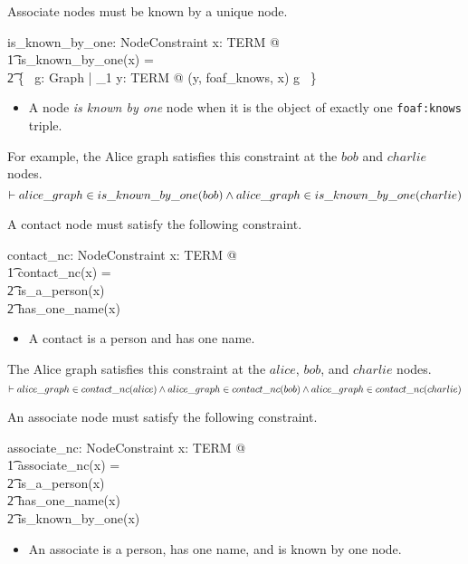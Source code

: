 \documentclass{article}
\begin{document}
Associate nodes must be known by a unique node.
\begin{axdef}
	is\_known\_by\_one: NodeConstraint
\where
	\forall x: TERM @ \\
\t1		is\_known\_by\_one(x) = \\
\t2			\{~ g: Graph | \exists_1 y: TERM @ (y, foaf\_knows, x) \in g ~\}
\end{axdef}
\begin{itemize}
\item A node {\em is known by one} node when it is the object of exactly one {\tt foaf:knows} triple.
\end{itemize}

For example, the Alice graph satisfies this constraint at the $bob$ and $charlie$ nodes.
\[\vdash
	alice\_graph \in is\_known\_by\_one(bob) \land \\
	alice\_graph \in is\_known\_by\_one(charlie)
\]

A contact node must satisfy the following constraint.
\begin{axdef}
	contact\_nc: NodeConstraint
\where
	\forall x: TERM @ \\
\t1		contact\_nc(x) = \\
\t2			is\_a\_person(x) \cap \\
\t2			has\_one\_name(x)
\end{axdef}
\begin{itemize}
\item A contact is a person and has one name.
\end{itemize}

The Alice graph satisfies this constraint at the $alice$, $bob$, and $charlie$ nodes.
\[\vdash
	alice\_graph \in contact\_nc(alice) \land \\
	alice\_graph \in contact\_nc(bob) \land \\
	alice\_graph \in contact\_nc(charlie)
\]

An associate node must satisfy the following constraint.
\begin{axdef}
	associate\_nc: NodeConstraint
\where
	\forall x: TERM @ \\
\t1		associate\_nc(x) = \\
\t2			is\_a\_person(x) \cap \\
\t2			has\_one\_name(x) \cap \\
\t2			is\_known\_by\_one(x)
\end{axdef}
\begin{itemize}
\item An associate is a person, has one name, and is known by one node.
\end{itemize}
\end{document}
